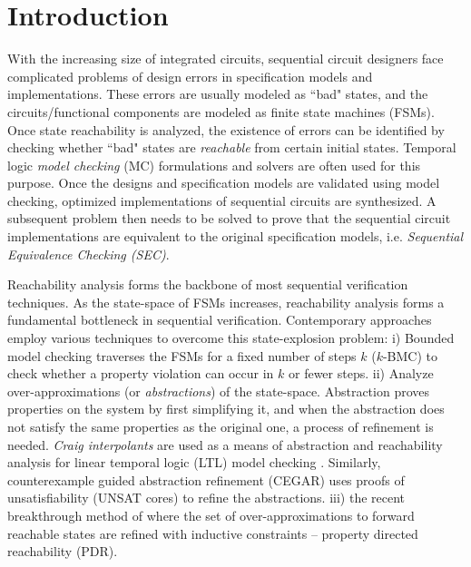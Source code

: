 \chapter{Introduction}
\label{ch:intro}
With the increasing size of integrated
circuits, sequential circuit designers face complicated problems of
design errors in specification models and implementations. These
errors are usually modeled as ``bad" states, and the
circuits/functional components are modeled as finite state machines
(FSMs). Once state reachability is analyzed, the existence of errors
can be identified by checking whether ``bad" states are {\it
  reachable} from certain initial states. Temporal logic {\it model
  checking} (MC) formulations and solvers are often used for this
purpose. Once the designs and specification models are validated using
model checking, optimized implementations of sequential circuits are
synthesized. A subsequent problem then needs to be solved to prove
that the sequential circuit implementations are equivalent to the
original specification models, i.e. {\it Sequential Equivalence
  Checking   (SEC)}. 

Reachability analysis forms the backbone of most sequential
verification techniques. As the state-space of FSMs increases,
reachability analysis forms a fundamental bottleneck in sequential
verification. Contemporary approaches employ various techniques to
overcome this state-explosion problem: i) Bounded model checking
\cite{bitlevel1} traverses the FSMs for a fixed number of steps $k$
($k$-BMC) to check whether a property violation can occur in $k$ or
fewer steps. ii) Analyze over-approximations (or {\it abstractions})
of the state-space. Abstraction proves properties on the system by
first simplifying it, and when the abstraction does not satisfy the
same properties as the original one, a process of refinement is
needed. {\it Craig interpolants} \cite{craig-interpolate}
\cite{pudlak:ci} are used as a means of abstraction and reachability
analysis for linear temporal logic (LTL) model checking
\cite{mcmillan:interpolation}. Similarly, counterexample guided
abstraction refinement (CEGAR) \cite{cegar-journal} uses proofs of
unsatisfiability (UNSAT cores) to refine the abstractions. iii) the
recent breakthrough method of \cite{bradley:pdr} where the set of
over-approximations to forward reachable states are refined with
inductive constraints -- property directed reachability (PDR). 

